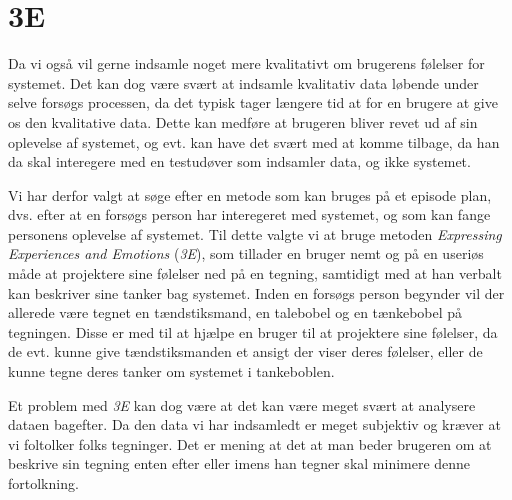 \section{3E}\label{sec:3E}
Da vi også vil gerne indsamle noget mere kvalitativt om brugerens følelser for systemet. Det kan dog være svært at indsamle kvalitativ data løbende under selve forsøgs processen, da det typisk tager længere tid at for en brugere at give os den kvalitative data. Dette kan medføre at brugeren bliver revet ud af sin oplevelse af systemet, og evt. kan have det svært med at komme tilbage, da han da skal interegere med en testudøver som indsamler data, og ikke systemet.

Vi har derfor valgt at søge efter en metode som kan bruges på et episode plan, dvs. efter at en forsøgs person har interegeret med systemet, og som kan fange personens oplevelse af systemet. Til dette valgte vi at bruge metoden \textit{Expressing Experiences and Emotions} (\textit{3E}), som tillader en bruger nemt og på en useriøs måde at projektere sine følelser ned på en tegning, samtidigt med at han verbalt kan beskriver sine tanker bag systemet. Inden en forsøgs person begynder vil der allerede være tegnet en tændstiksmand, en talebobel og en tænkebobel på tegningen. Disse er med til at hjælpe en bruger til at projektere sine følelser, da de evt. kunne give tændstiksmanden et ansigt der viser deres følelser, eller de kunne tegne deres tanker om systemet i tankeboblen.

Et problem med \textit{3E} kan dog være at det kan være meget svært at analysere dataen bagefter. Da den data vi har indsamledt er meget subjektiv og kræver at vi foltolker folks tegninger. Det er mening at det at man beder brugeren om at beskrive sin tegning enten efter eller imens han tegner skal minimere denne fortolkning.


